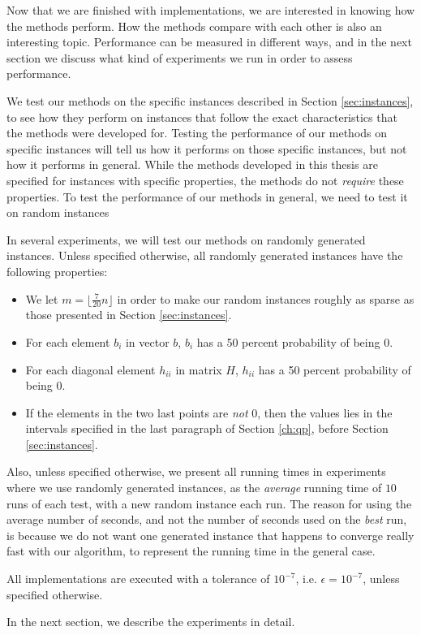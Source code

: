 Now that we are finished with implementations, we are interested in knowing
how the methods perform.
How the methods compare with each other is also an interesting topic.
Performance can be measured in different ways, and in the next section we
discuss what kind of experiments we run in order to assess performance.

We test our methods on the specific instances described in
Section \ref{sec:instances}, to see how they perform on instances that follow
the exact characteristics that the methods were developed for.
Testing the performance of our methods on specific instances will tell us
how it performs on those specific instances, but not how it performs in general.
While the methods developed in this thesis are specified for instances with
specific properties, the methods do not \emph{require} these properties.
To test the performance of our methods in general, we need to test it
on random instances

In several experiments, we will test our methods on randomly generated
instances.
Unless specified otherwise, all randomly generated instances have
the following properties:
\begin{itemize}
\item We let $m = \lfloor \frac{7}{20}n \rfloor$ in order to make our random
      instances roughly as sparse as those presented in Section
      \ref{sec:instances}.
\item For each element $b_i$ in vector $b$, $b_i$ has a 50 percent probability of being 0.
\item For each diagonal element $h_{ii}$ in matrix $H$, $h_{ii}$ has a 50 percent
      probability of being 0.
\item If the elements in the two last points are \emph{not} 0, then the values lies in
      the intervals specified in the last paragraph of Section \ref{ch:qp}, before
      Section \ref{sec:instances}.
\end{itemize}

Also, unless specified otherwise, we present all running times in experiments where
we use randomly generated instances, as the \emph{average} running time of
$10$ runs of each test, with a new random instance each run.
The reason for using the average number of seconds, and
not the number of seconds used on the \emph{best} run, is because we do not want
one generated instance that happens to converge really fast with our algorithm,
to represent the running time in the general case.

All implementations are executed with a tolerance of $10^{-7}$, i.e.
$\epsilon = 10^{-7}$, unless specified otherwise.

In the next section, we describe the experiments in detail.

